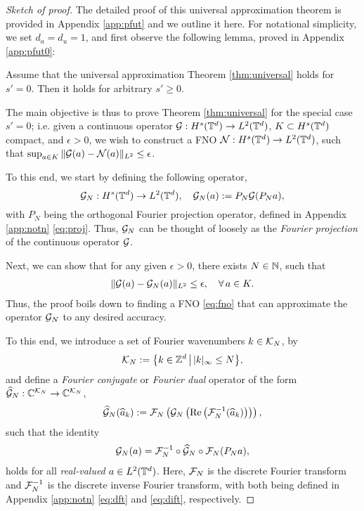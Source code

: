 \documentclass[reqno,a4paper]{amsart}
\begin{document}
\begin{proof}[Sketch of proof]
The detailed proof of this universal approximation theorem is provided in Appendix \ref{app:pfut} and we outline it here. For notational simplicity, we set $d_a=d_u=1$,
and first observe the following lemma, proved in Appendix \ref{app:pfut0}:
\begin{lemma} \label{lem:fut0}
Assume that the universal approximation Theorem \ref{thm:universal} holds for $s'=0$. Then it holds for arbitrary $s'\ge 0$.
\end{lemma}
The main objective is thus to prove Theorem \ref{thm:universal} for the special case $s'=0$; i.e. given a continuous operator $\mathcal{G}: H^s(\mathbb{T}^d) \to L^2(\mathbb{T}^d)$, $K\subset H^s(\mathbb{T}^d)$ compact, and $\epsilon>0$, we wish to construct a FNO $\mathcal{N}: H^s(\mathbb{T}^d) \to L^2(\mathbb{T}^d)$, such that ${\sup_{a\in K}\Vert \mathcal{G}(a) - \mathcal{N}(a) \Vert_{L^2} \le \epsilon}$. 

To this end, we start by defining the following operator,
\begin{equation}
    \label{eq:defGN}
\mathcal{G}_N: H^{s}(\mathbb{T}^d) \to L^2(\mathbb{T}^d), \quad
\mathcal{G}_N(a) := P_N\mathcal{G}(P_Na),
\end{equation}
with $P_N$ being the orthogonal Fourier projection operator, defined in Appendix \ref{app:notn} \eqref{eq:proj}. Thus, $\mathcal{G}_N$ can be thought of loosely as the \emph{Fourier projection} of the continuous operator $\mathcal{G}$.

Next, we can show that for any given $\epsilon > 0$, there exists $N\in \mathbb{N}$, such that 
\begin{align} \label{eq:GN}
\Vert \mathcal{G}(a) - \mathcal{G}_N(a) \Vert_{L^2} \le \epsilon, \quad
\forall \, a \in K.
\end{align}
Thus, the proof boils down to finding a FNO \eqref{eq:fno} that can approximate the operator $\mathcal{G}_N$ to any desired accuracy. 

To this end, we introduce a set of Fourier wavenumbers $k\in \mathcal{K}_N$, by 
\begin{align} 
\label{eq:k}
\mathcal{K}_N := {\left\{ k\in \mathbb{Z}^d \,\middle|\, |k|_\infty \le N \right\}},
\end{align}
and define a \emph{Fourier conjugate} or \emph{Fourier dual} operator of the form
$\widehat{\mathcal{G}}_N: \mathbb{C}^{\mathcal{K}_N} \to \mathbb{C}^{\mathcal{K}_N}$, 
\begin{equation}
\label{eq:Fconj}
\widehat{\mathcal{G}}_N(\widehat{a}_k)
:= 
\mathcal{F}_N \left( \mathcal{G}_N \left( \mathrm{Re}\left(\mathcal{F}^{-1}_N(\widehat{a}_k)\right)\right)\right),
\end{equation}
such that the identity
\begin{align} \label{eq:decompG}
\mathcal{G}_N(a) = \mathcal{F}_N^{-1} \circ \widehat{\mathcal{G}}_N \circ \mathcal{F}_N(P_Na),
\end{align}
holds for all \emph{real-valued} $a\in L^2(\mathbb{T}^d)$. Here, $\mathcal{F}_N$ is the discrete Fourier transform and $\mathcal{F}_N^{-1}$ is the discrete inverse Fourier transform, with both being defined in Appendix \ref{app:notn} \eqref{eq:dft} and \eqref{eq:dift}, respectively.


\end{proof}
\end{document}
